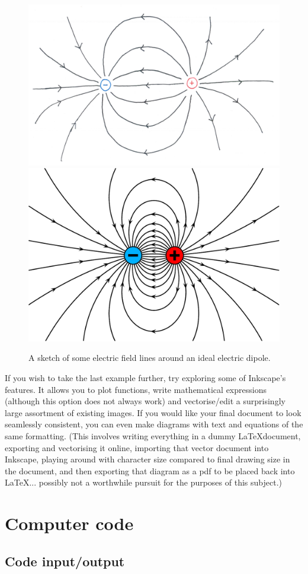 \begin{figure}[h!]
\begin{center}
\includegraphics[width=0.50\linewidth]{figures/dipole_hand.png}\hspace{1cm}
\includegraphics[width=0.40\linewidth]{figures/dipole_vector.pdf}
\end{center}
\caption{A sketch of some electric field lines around an ideal electric dipole.}
\label{fig:handcomp}
\end{figure}

If you wish to take the last example further, try exploring some of Inkscape's features. It allows you to plot functions, write mathematical expressions (although this option does not always work) and vectorise/edit a surprisingly large assortment of existing images. If you would like your final document to look seamlessly consistent, you can even make diagrams with text and equations of the same formatting. (This involves writing everything in a dummy \LaTeX document, exporting and vectorising it online, importing that vector document into Inkscape, playing around with character size compared to final drawing size in the document, and then exporting that diagram as a pdf to be placed back into \LaTeX ... possibly not a worthwhile pursuit for the purposes of this subject.)

\section{Computer code}\label{sec:code}
\subsection{Code input/output}\label{subsec:codeinout}

